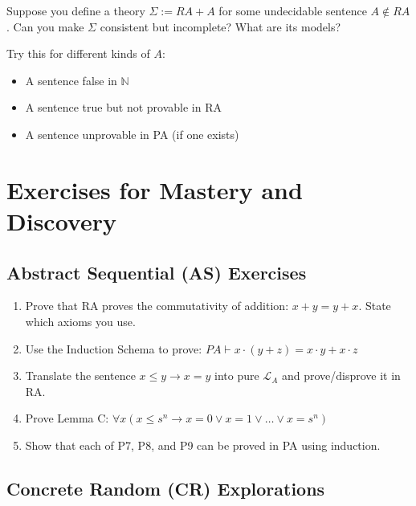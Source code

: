 \documentclass[12pt]{article}
\begin{document}
Suppose you define a theory \( \Sigma := RA + A \) for some undecidable sentence \( A \notin RA \). Can you make \( \Sigma \) consistent but incomplete? What are its models?

Try this for different kinds of \( A \):
\begin{itemize}
  \item A sentence false in \( \mathbb{N} \)
  \item A sentence true but not provable in RA
  \item A sentence unprovable in PA (if one exists)
\end{itemize}

\section{Exercises for Mastery and Discovery}

\subsection{Abstract Sequential (AS) Exercises}

\begin{enumerate}[label=\textbf{A\arabic*.}]
  \item Prove that RA proves the commutativity of addition: \( x + y = y + x \). State which axioms you use.
  \item Use the Induction Schema to prove:  
    \( PA \vdash x \cdot (y + z) = x \cdot y + x \cdot z \)
  \item Translate the sentence \( x \leq y \rightarrow x = y \) into pure \( \mathcal{L}_A \) and prove/disprove it in RA.
  \item Prove Lemma C: \( \forall x(x \leq s^n \rightarrow x = 0 \vee x = 1 \vee \dots \vee x = s^n) \)
  \item Show that each of P7, P8, and P9 can be proved in PA using induction.
\end{enumerate}

\subsection{Concrete Random (CR) Explorations}
\end{document}
